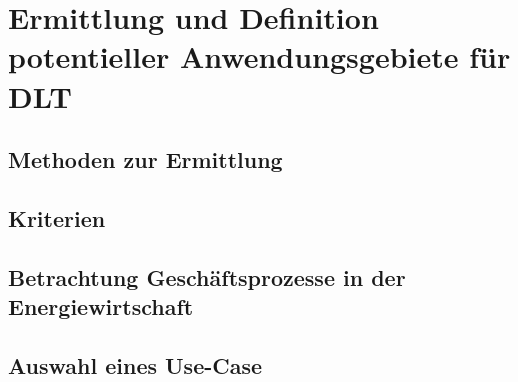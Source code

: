 \section{Ermittlung und Definition potentieller Anwendungsgebiete für DLT}

\subsection{Methoden zur Ermittlung}

\subsection{Kriterien}

\subsection{Betrachtung Geschäftsprozesse in der Energiewirtschaft}

\subsection{Auswahl eines Use-Case}

\newpage